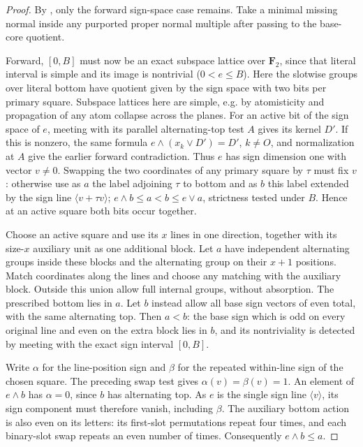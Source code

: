 \begin{proof}

By , only the
forward sign-space case remains.  Take a minimal missing normal inside any
purported proper normal multiple after passing to the base-core quotient.

Forward, \([0,B]\) must now be an exact subspace lattice over \(\mathbf F_2\), since that literal
interval is simple and its image is nontrivial (\(0<e\le B\)). Here the slotwise groups over
literal bottom have quotient given by the sign space with two bits per primary square. Subspace
lattices here are simple, e.g. by atomisticity and propagation of any atom collapse across the
planes. For an active bit of the sign space of \(e\), meeting with its parallel alternating-top
test \(A\) gives its kernel \(D'\). If this is nonzero, the same formula \(e\wedge(x_k\vee
D')=D'\), \(k\ne O\), and normalization at \(A\) give the earlier forward contradiction. Thus
\(e\) has sign dimension one with vector \(v\ne0\). Swapping the two coordinates of any primary
square by \(\tau\) must fix \(v\): otherwise use as \(a\) the label adjoining \(\tau\) to bottom
and as \(b\) this label extended by the sign line \(\langle v+\tau v\rangle\); \(e\wedge b\le
a<b\le e\vee a\), strictness tested under \(B\). Hence at an active square both bits occur
together.

Choose an active square and use its \(x\) lines in one direction,
together with its size-\(x\) auxiliary unit as one additional block.
Let \(a\) have independent alternating groups inside these blocks and
the alternating group on their \(x+1\) positions.  Match coordinates
along the lines and choose any matching with the auxiliary block.
Outside this union allow full internal groups, without absorption.
The prescribed bottom lies in \(a\).  Let \(b\) instead allow all base
sign vectors of even total, with the same alternating top.  Then
\(a<b\): the base sign which is odd on every original line and even
on the extra block lies in \(b\), and its nontriviality is detected by
meeting with the exact sign interval \([0,B]\).

Write \(\alpha\) for the line-position sign and \(\beta\) for the
repeated within-line sign of the chosen square.  The preceding swap
test gives \(\alpha(v)=\beta(v)=1\).  An element of \(e\wedge b\)
has \(\alpha=0\), since \(b\) has alternating top.  As \(e\) is the
single sign line \(\langle v\rangle\), its sign component must
therefore vanish, including \(\beta\).  The auxiliary bottom action
is also even on its letters: its first-slot permutations repeat four
times, and each binary-slot swap repeats an even number of times.
Consequently \(e\wedge b\le a\).


\end{proof}
